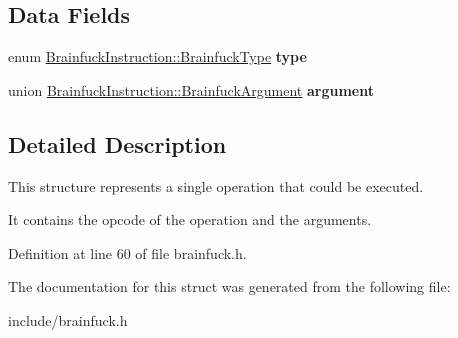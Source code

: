 \subsection*{Data Fields}
\begin{DoxyCompactItemize}
\item 
\hypertarget{structBrainfuckInstruction_a36afb590d39c03c56d8887fef280e5f8}{}enum \hyperlink{group__ast_ga536105595916938ef76e66bb1cdf7b2b}{Brainfuck\+Instruction\+::\+Brainfuck\+Type} {\bfseries type}\label{structBrainfuckInstruction_a36afb590d39c03c56d8887fef280e5f8}

\item 
\hypertarget{structBrainfuckInstruction_a20bdad657a1486dd42fa39e0e046cfaa}{}union \hyperlink{unionBrainfuckInstruction_1_1BrainfuckArgument}{Brainfuck\+Instruction\+::\+Brainfuck\+Argument} {\bfseries argument}\label{structBrainfuckInstruction_a20bdad657a1486dd42fa39e0e046cfaa}

\end{DoxyCompactItemize}


\subsection{Detailed Description}
This structure represents a single operation that could be executed. 

It contains the opcode of the operation and the arguments. 

Definition at line 60 of file brainfuck.\+h.



The documentation for this struct was generated from the following file\+:\begin{DoxyCompactItemize}
\item 
include/brainfuck.\+h\end{DoxyCompactItemize}
